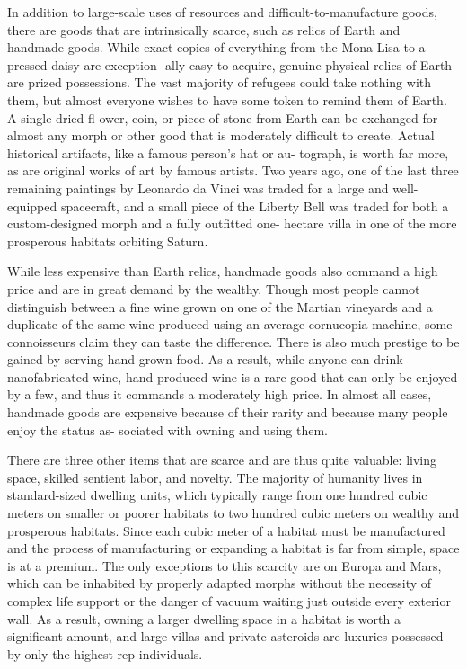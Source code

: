 In addition to large-scale uses of resources and 
difficult-to-manufacture goods, there are goods that 
are intrinsically scarce, such as relics of Earth and 
handmade goods. While exact copies of everything 
from the Mona Lisa to a pressed daisy are exception-
ally easy to acquire, genuine physical relics of Earth 
are prized possessions. The vast majority of refugees 
could take nothing with them, but almost everyone 
wishes to have some token to remind them of Earth. A 
single dried fl ower, coin, or piece of stone from Earth 
can be exchanged for almost any morph or other 
good that is moderately difficult to create. Actual 
historical artifacts, like a famous person's hat or au-
tograph, is worth far more, as are original works of 
art by famous artists. Two years ago, one of the last 
three remaining paintings by Leonardo da Vinci was 
traded for a large and well-equipped spacecraft, and 
a small piece of the Liberty Bell was traded for both 
a custom-designed morph and a fully outfitted one-
hectare villa in one of the more prosperous habitats 
orbiting Saturn.

While less expensive than Earth relics, handmade 
goods also command a high price and are in great 
demand by the wealthy. Though most people cannot 
distinguish between a fine wine grown on one of 
the Martian vineyards and a duplicate of the same 
wine produced using an average cornucopia machine, 
some connoisseurs claim they can taste the difference. 
There is also much prestige to be gained by serving 
hand-grown food. As a result, while anyone can drink 
nanofabricated wine, hand-produced wine is a rare 
good that can only be enjoyed by a few, and thus 
it commands a moderately high price. In almost all 
cases, handmade goods are expensive because of their 
rarity and because many people enjoy the status as-
sociated with owning and using them.

There are three other items that are scarce and 
are thus quite valuable: living space, skilled sentient 
labor, and novelty. The majority of humanity lives in 
standard-sized dwelling units, which typically range 
from one hundred cubic meters on smaller or poorer 
habitats to two hundred cubic meters on wealthy 
and prosperous habitats. Since each cubic meter of 
a habitat must be manufactured and the process of 
manufacturing or expanding a habitat is far from 
simple, space is at a premium. The only exceptions 
to this scarcity are on Europa and Mars, which can 
be inhabited by properly adapted morphs without 
the necessity of complex life support or the danger of 
vacuum waiting just outside every exterior wall. As 
a result, owning a larger dwelling space in a habitat 
is worth a significant amount, and large villas and 
private asteroids are luxuries possessed by only the 
highest rep individuals.

